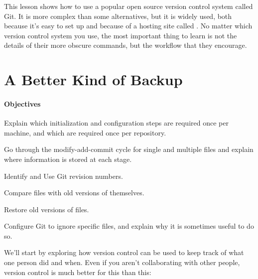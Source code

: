 \documentclass{book}
\begin{document}
This lesson shows how to use a popular open source version control
system called Git. It is more complex than some alternatives, but it is
widely used, both because it's easy to set up and because of a hosting
site called . No matter which version
control system you use, the most important thing to learn is not the
details of their more obscure commands, but the workflow that they
encourage.

\section{A Better Kind of Backup}

\mbox{}\paragraph{Objectives}

\begin{swcitemize}
\item
  Explain which initialization and configuration steps are required once
  per machine, and which are required once per repository.
\item
  Go through the modify-add-commit cycle for single and multiple files
  and explain where information is stored at each stage.
\item
  Identify and Use Git revision numbers.
\item
  Compare files with old versions of themselves.
\item
  Restore old versions of files.
\item
  Configure Git to ignore specific files, and explain why it is
  sometimes useful to do so.
\end{swcitemize}

We'll start by exploring how version control can be used to keep track
of what one person did and when. Even if you aren't collaborating with
other people, version control is much better for this than this:
\end{document}

